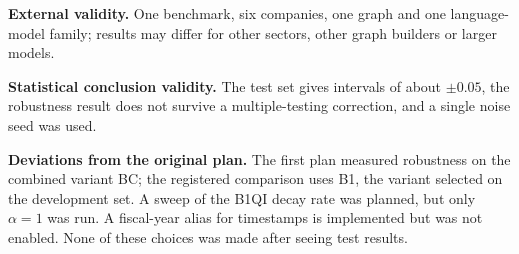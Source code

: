 \textbf{External validity.} One benchmark, six companies, one graph and one language-model family; results may differ for other sectors, other graph builders or larger models.

\textbf{Statistical conclusion validity.} The test set gives intervals of about $\pm 0.05$, the robustness result does not survive a multiple-testing correction, and a single noise seed was used.

\textbf{Deviations from the original plan.} The first plan measured robustness on the combined variant BC; the registered comparison uses B1, the variant selected on the development set. A sweep of the B1QI decay rate was planned, but only $\alpha = 1$ was run. A fiscal-year alias for timestamps is implemented but was not enabled. None of these choices was made after seeing test results.

\fi

